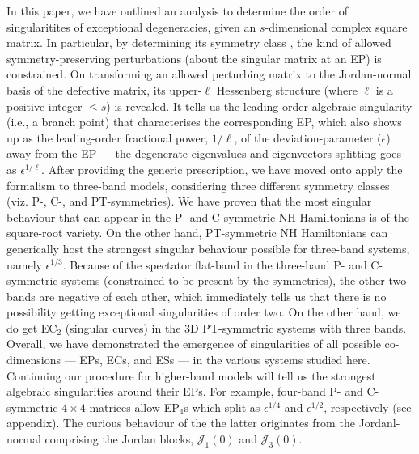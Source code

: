 \documentclass[aps, prb, onecolumn, nofootinbib, citeautoscript, 10pt]{revtex4-2}
\begin{document}
In this paper, we have outlined an analysis to determine the order of singularitites of exceptional degeneracies, given an $s$-dimensional complex square matrix. In particular, by determining its symmetry class \cite{bernard}, the kind of allowed symmetry-preserving perturbations (about the singular matrix at an EP) is constrained. On transforming an allowed perturbing matrix to the Jordan-normal basis of the defective matrix, its upper-$\ell$ Hessenberg structure (where $\ell$ is a positive integer $\leq s $) is revealed. It tells us the leading-order algebraic singularity (i.e., a branch point) that characterises the corresponding EP, which also shows up as the leading-order fractional power, $1/\ell$, of the deviation-parameter ($\epsilon$) away from the EP --- the degenerate eigenvalues and eigenvectors splitting goes as $\epsilon^{1/\ell} $. After providing the generic prescription, we have moved onto apply the formalism to three-band models, considering three different symmetry classes (viz. P-, C-, and PT-symmetries). We have proven that the most singular behaviour that can appear in the P- and C-symmetric NH Hamiltonians is of the square-root variety. On the other hand, PT-symmetric NH Hamiltonians can generically host the strongest singular behaviour possible for three-band systems, namely $\epsilon^{1/3} $. Because of the spectator flat-band in the three-band P- and C-symmetric systems (constrained to be present by the symmetries), the other two bands are negative of each other, which immediately tells us that there is no possibility getting exceptional singularities of order two. On the other hand, we do get EC$_2$ (singular curves) in the 3D PT-symmetric systems with three bands. Overall, we have demonstrated the emergence of singularities of all possible co-dimensions --- EPs, ECs, and ESs --- in the various systems studied here. Continuing our procedure for higher-band models will tell us the strongest algebraic singularities around their EPs. For example, four-band P- and C-symmetric $4\times 4$ matrices allow EP$_4$s which split as $\epsilon^{1/4}$ and $\epsilon^{1/2}$, respectively (see appendix). The curious behaviour of the the latter originates from the Jordanl-normal comprising the Jordan blocks, $\mathcal{J}_1 (0)$ and $\mathcal{J}_3 (0)$. 
\end{document}
